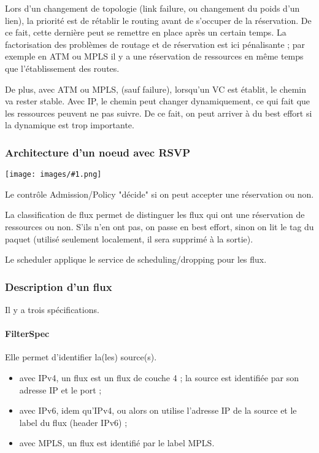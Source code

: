 \documentclass[10pt,a4paper]{report}
\newcommand{\dessin}[1]{\begin{center}\texttt{[image: images/\#1.png]}\end{center}}
\begin{document}
			Lors d'un changement de topologie (link failure, ou changement du poids d'un lien), la priorité est de rétablir le routing avant de s'occuper de la réservation. De ce fait, cette dernière peut se remettre en place après un certain temps. La factorisation des problèmes de routage et de réservation est ici pénalisante ; par exemple en ATM ou MPLS il y a une réservation de ressources en même temps que l'établissement des routes. 
		
			De plus, avec ATM ou MPLS, (sauf failure), lorsqu'un VC est établit, le chemin va rester stable. Avec IP, le chemin peut changer dynamiquement, ce qui fait que les ressources peuvent ne pas suivre. De ce fait, on peut arriver à du best effort si la dynamique est trop importante.
		
			\subsubsection{Architecture d'un noeud avec RSVP}
			
			\dessin{126}
			
			Le contrôle Admission/Policy "décide" si on peut accepter une réservation ou non.
			
			La classification de flux permet de distinguer les flux qui ont une réservation de ressources ou non. S'ils n'en ont pas, on passe en best effort, sinon on lit le tag du paquet (utilisé seulement localement, il sera supprimé à la sortie).
			
			Le scheduler applique le service de scheduling/dropping pour les flux.
			
			\subsubsection{Description d'un flux}
			Il y a trois spécifications.
		
			\paragraph{FilterSpec}
			
			Elle permet d'identifier la(les) source(s).
			
			\begin{itemize}
				\item avec IPv4, un flux est un flux de couche 4 ; la source est identifiée par son adresse IP et le port ;
				\item avec IPv6, idem qu'IPv4, ou alors on utilise l'adresse IP de la source et le label du flux (header IPv6) ;
				
				\item avec MPLS, un flux est identifié par le label MPLS.
			\end{itemize}
			
\end{document}

